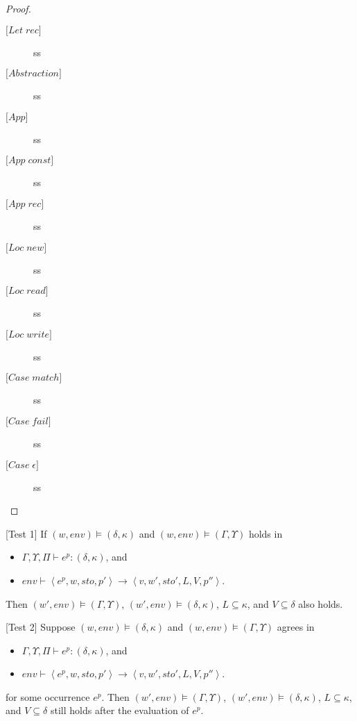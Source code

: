 \documentclass[../../master.tex]{subfiles}
\begin{document}
\begin{proof}
\begin{description}
		\item[$\lbrack Let \; rec \rbrack$] ss
		\item[$\lbrack Abstraction \rbrack$] ss
		\item[$\lbrack App \rbrack$] ss
		\item[$\lbrack App \; const \rbrack$] ss
		\item[$\lbrack App \; rec \rbrack$] ss
		\item[$\lbrack Loc \; new \rbrack$] ss
		\item[$\lbrack Loc \; read \rbrack$] ss
		\item[$\lbrack Loc \; write \rbrack$] ss
		\item[$\lbrack Case \; match \rbrack$] ss
		\item[$\lbrack Case \; fail \rbrack$] ss
		\item[$\lbrack Case \; \epsilon \rbrack$] ss
	\end{description}
\end{proof}

\iffalse
\begin{theorem}{[Test 1]}
	If $(w,env)\models(\delta,\kappa)$ and $(w,env)\models(\Gamma,\Upsilon)$ holds in
	\begin{itemize}
		\item $\Gamma,\Upsilon,\Pi\vdash e^p : (\delta,\kappa)$, and 
		\item $env\vdash\left\langle e^p,w,sto,p'\right\rangle\rightarrow\left\langle v,w',sto',L,V,p''\right\rangle$.
	\end{itemize}
	Then $(w',env)\models(\Gamma,\Upsilon)$, $(w',env)\models(\delta,\kappa)$, $L\subseteq\kappa$, and $V\subseteq\delta$ also holds.
\end{theorem}

\begin{theorem}{[Test 2]}
	Suppose $(w,env)\models(\delta,\kappa)$ and $(w,env)\models(\Gamma,\Upsilon)$ agrees in
	\begin{itemize}
		\item $\Gamma,\Upsilon,\Pi\vdash e^p : (\delta,\kappa)$, and 
		\item $env\vdash\left\langle e^p,w,sto,p'\right\rangle\rightarrow\left\langle v,w',sto',L,V,p''\right\rangle$.
	\end{itemize}
	for some occurrence $e^p$.
	Then $(w',env)\models(\Gamma,\Upsilon)$, $(w',env)\models(\delta,\kappa)$, $L\subseteq\kappa$, and $V\subseteq\delta$ still holds after the evaluation of $e^p$.
\end{theorem}
\end{document}

